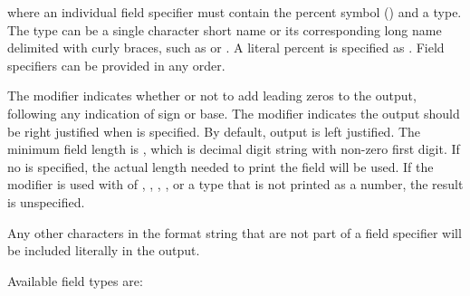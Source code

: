 \begin{ompSyntax}
\end{ompSyntax}

where an individual field specifier must contain the percent symbol ({\pcode{\%}}) and a type.
The type can be a single character short name or its corresponding long name delimited with curly braces,
 such as {} or {}.
A literal percent is specified as {\pcode{\%\%}}.  Field specifiers can be provided in any order.

The  modifier indicates whether or not to add leading zeros to the output,
following any indication of sign or base.
The  modifier indicates the output should be right justified when  is specified.
By default, output is left justified.
The minimum field length is , which is decimal digit string
with non-zero first digit.
If no  is specified, the actual length needed to print the field will be used.
If the  modifier is used with  of , {},
, {}, or a type that is not printed as a number, the
result is unspecified.

Any other characters in the format string that are not part of a field specifier will be included literally
in the output.

Available field types are:

